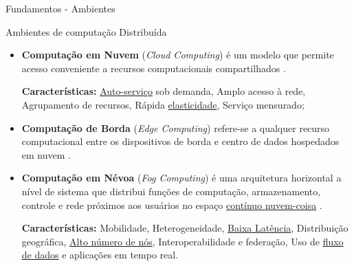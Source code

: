 \documentclass[aspectratio=1610,10pt]{beamer}
\begin{document}
\begin{frame}[fragile]{Fundamentos - Ambientes}
  \begin{alertblock}{Ambientes de computação Distribuída}
  \begin{itemize}%
    
    \vspace{1.0em}\item \textbf{Computação em Nuvem} (\emph{Cloud Computing}) é
    um modelo que permite acesso conveniente a recursos computacionais
    compartilhados \cite{NIST2011}.

    \textbf{Características:}
      \underline{Auto-serviço} sob demanda,
      Amplo acesso à rede,
      Agrupamento de recursos,
      Rápida \underline{elasticidade},
      Serviço mensurado;
    
    \vspace{1.0em}\item \textbf{Computação de Borda} (\emph{Edge Computing})
    refere-se a qualquer recurso computacional entre os dispositivos de borda e
    centro de dados hospedados em nuvem \cite{Shi2016}.
    
    \vspace{1.0em}\item \textbf{Computação em Névoa} (\emph{Fog Computing}) é
    uma arquitetura horizontal a nível de sistema que distribui funções de
    computação, armazenamento, controle e rede próximos aos usuários no espaço
    \underline{contínuo nuvem-coisa} \cite{IEEECommunicationsSociety2018}.
    
    \textbf{Características:}
        Mobilidade,
        Heterogeneidade,
        \underline{Baixa Latência},
        Distribuição geográfica,
        \underline{Alto número de nós},
        Interoperabilidade e federação,
        Uso de \underline{fluxo de dados} e aplicações em tempo real.
  \end{itemize}
  \end{alertblock}
\end{frame}
\end{document}
